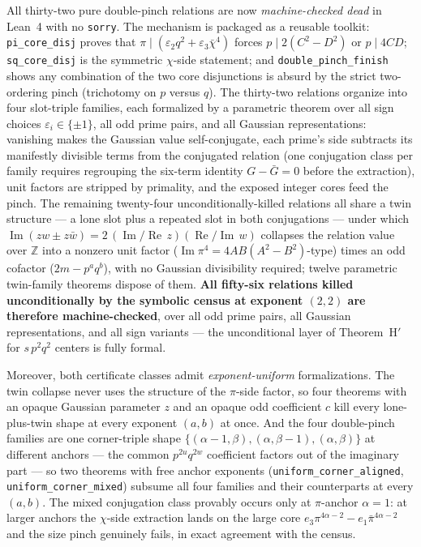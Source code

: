 \documentclass[11pt]{article}
\theoremstyle{remark}
\DeclareMathOperator{\im}{Im}
\DeclareMathOperator{\re}{Re}
\begin{document}
All thirty-two pure double-pinch relations are now
\emph{machine-checked dead} in Lean~4 with no \texttt{sorry}.  The
mechanism is packaged as a reusable toolkit: \texttt{pi\_core\_disj}
proves that $\pi \mid (\varepsilon_2 q^2 + \varepsilon_3\bar\chi^4)$
forces $p \mid 2(C^2-D^2)$ or $p \mid 4CD$;
\texttt{sq\_core\_disj} is the symmetric $\chi$-side statement; and
\texttt{double\_pinch\_finish} shows any combination of the two core
disjunctions is absurd by the strict two-ordering pinch (trichotomy on
$p$ versus $q$).  The thirty-two relations organize into four
slot-triple families, each formalized by a parametric theorem over all
sign choices $\varepsilon_i \in \{\pm 1\}$, all odd prime pairs, and
all Gaussian representations: vanishing makes the Gaussian value
self-conjugate, each prime's side subtracts its manifestly divisible
terms from the conjugated relation (one conjugation class per family
requires regrouping the six-term identity $G - \bar G = 0$ before the
extraction), unit factors are stripped by primality, and the exposed
integer cores feed the pinch.  The remaining twenty-four unconditionally-killed
relations all share a twin structure — a lone slot plus a repeated
slot in both conjugations — under which
$\im(zw \pm z\bar w) = 2\,(\im/\re\,z)(\re/\im\,w)$
collapses the relation value over $\mathbb{Z}$ into a nonzero unit
factor ($\im \pi^4 = 4AB(A^2-B^2)$-type) times an odd cofactor
($2m - p^aq^b$), with no Gaussian divisibility required; twelve
parametric twin-family theorems dispose of them.  \textbf{All
fifty-six relations killed unconditionally by the symbolic census at
exponent $(2,2)$ are therefore machine-checked}, over all odd prime
pairs, all Gaussian representations, and all sign variants — the
unconditional layer of Theorem~H$'$ for $s\,p^2q^2$ centers is fully
formal.

Moreover, both certificate classes admit \emph{exponent-uniform}
formalizations.  The twin collapse never uses the structure of the
$\pi$-side factor, so four theorems with an opaque Gaussian
parameter $z$ and an opaque odd coefficient $c$ kill every lone-plus-twin
shape at every exponent $(a,b)$ at once.  And the four double-pinch
families are one corner-triple shape
$\{(\alpha-1,\beta),(\alpha,\beta-1),(\alpha,\beta)\}$ at different
anchors — the common $p^{2u}q^{2w}$ coefficient factors out of the
imaginary part — so two theorems with free anchor exponents
(\texttt{uniform\_corner\_aligned}, \texttt{uniform\_corner\_mixed})
subsume all four families and their counterparts at every $(a,b)$.
The mixed conjugation class provably occurs only at $\pi$-anchor
$\alpha = 1$: at larger anchors the $\chi$-side extraction lands on the
large core $e_3\pi^{4\alpha-2} - e_1\bar\pi^{4\alpha-2}$ and the size
pinch genuinely fails, in exact agreement with the census.
\end{document}
